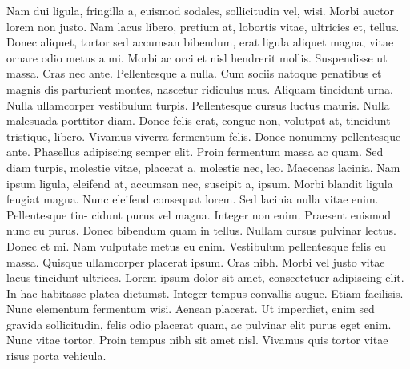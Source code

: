 \documentclass{article}
\begin{document}
Nam dui ligula, fringilla a, euismod sodales, sollicitudin vel, wisi. Morbi auctor lorem non justo.
Nam lacus libero, pretium at, lobortis vitae, ultricies et, tellus. Donec aliquet, tortor sed accumsan
bibendum, erat ligula aliquet magna, vitae ornare odio metus a mi. Morbi ac orci et nisl hendrerit
mollis. Suspendisse ut massa. Cras nec ante. Pellentesque a nulla. Cum sociis natoque penatibus
et magnis dis parturient montes, nascetur ridiculus mus. Aliquam tincidunt urna. Nulla ullamcorper
vestibulum turpis. Pellentesque cursus luctus mauris.
Nulla malesuada porttitor diam. Donec felis erat, congue non, volutpat at, tincidunt tristique, libero.
Vivamus viverra fermentum felis. Donec nonummy pellentesque ante. Phasellus adipiscing semper
elit. Proin fermentum massa ac quam. Sed diam turpis, molestie vitae, placerat a, molestie nec, leo.
Maecenas lacinia. Nam ipsum ligula, eleifend at, accumsan nec, suscipit a, ipsum. Morbi blandit
ligula feugiat magna. Nunc eleifend consequat lorem. Sed lacinia nulla vitae enim. Pellentesque tin-
cidunt purus vel magna. Integer non enim. Praesent euismod nunc eu purus. Donec bibendum quam
in tellus. Nullam cursus pulvinar lectus. Donec et mi. Nam vulputate metus eu enim. Vestibulum
pellentesque felis eu massa.
Quisque ullamcorper placerat ipsum. Cras nibh. Morbi vel justo vitae lacus tincidunt ultrices. Lorem
ipsum dolor sit amet, consectetuer adipiscing elit. In hac habitasse platea dictumst. Integer tempus
convallis augue. Etiam facilisis. Nunc elementum fermentum wisi. Aenean placerat. Ut imperdiet,
enim sed gravida sollicitudin, felis odio placerat quam, ac pulvinar elit purus eget enim. Nunc vitae
tortor. Proin tempus nibh sit amet nisl. Vivamus quis tortor vitae risus porta vehicula.


\clearpage


\end{document}
